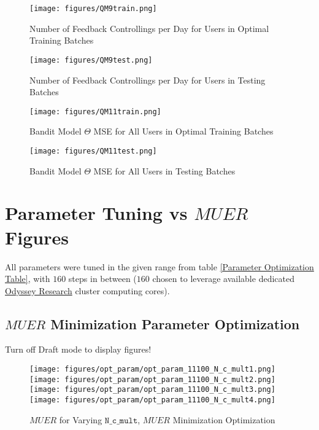 	\begin{figure}[H]
	\texttt{[image: figures/QM9train.png]}%
	\caption{Number of Feedback Controllings per Day for Users in Optimal Training Batches}
	\label{QM9train}
	\end{figure}

	\begin{figure}[H]
	\texttt{[image: figures/QM9test.png]}%
	\caption{Number of Feedback Controllings per Day for Users in Testing Batches}
	\label{QM9test}
	\end{figure}

	\begin{figure}[H]
	\texttt{[image: figures/QM11train.png]}%
	\caption{Bandit Model $\Theta$ MSE for All Users in Optimal Training Batches}
	\label{QM11train}
	\end{figure}

	\begin{figure}[H]
	\texttt{[image: figures/QM11test.png]}%
	\caption{Bandit Model $\Theta$ MSE for All Users in Testing Batches}
	\label{QM11test}
	\end{figure}

	\fi



\section{Parameter Tuning vs $MUER$ Figures}

All parameters were tuned in the given range from table \ref{Parameter Optimization Table}, with $160$ steps in between ($160$ chosen to leverage available dedicated \href{https://www.rc.fas.harvard.edu/}{Odyssey Research} cluster computing cores).


\subsection{$MUER$ Minimization Parameter Optimization}
\label{MUER Minimization Parameter Optimization}

	\ifdraft
	Turn off Draft mode to display figures!
	\else
	\begin{figure}[H]
	\texttt{[image: figures/opt\_param/opt\_param\_11100\_N\_c\_mult1.png]}%
	\texttt{[image: figures/opt\_param/opt\_param\_11100\_N\_c\_mult2.png]}%
	\texttt{[image: figures/opt\_param/opt\_param\_11100\_N\_c\_mult3.png]}%
	\texttt{[image: figures/opt\_param/opt\_param\_11100\_N\_c\_mult4.png]}%
	\caption{$MUER$ for Varying $\mathtt{N\_c\_mult}$, $MUER$ Minimization Optimization}
	\end{figure}

